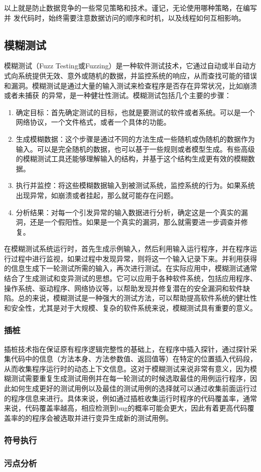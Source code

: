 以上就是防止数据竞争的一些常见策略和技术。谨记，无论使用哪种策略，在编写并 发代码时，始终需要注意数据访问的顺序和时机，以及线程如何互相影响。

\subsection{模糊测试}

模糊测试（Fuzz Testing或Fuzzing）是一种软件测试技术，它通过自动或半自动方式向系统提供无效、意外或随机的数据，并监控系统的响应，从而查找可能的错误和漏洞。模糊测试是通过大量的输入测试来检查程序是否存在异常状况，比如崩溃或者未捕获 的异常，是一种健壮性测试。模糊测试包括几个主要的步骤：

\begin{enumerate}
\item 确定目标：首先确定测试的目标，也就是要测试的软件或者系统。可以是一个网络协议，一个文件格式，或者一个具体的功能。
\item 生成模糊数据：这个步骤是通过不同的方法生成一些随机或伪随机的数据作为输入。可以是完全随机的数据，也可以基于一些规则或者模型生成。有些高级的模糊测试工具还能够理解输入的结构，并基于这个结构生成更有效的模糊数据。
\item 执行并监控：将这些模糊数据输入到被测试系统，监控系统的行为。如果系统出现异常，如崩溃或者挂起，那么就可能存在问题。
\item 分析结果：对每一个引发异常的输入数据进行分析，确定这是一个真实的漏洞，还是一个假阳性。如果是一个真实的漏洞，那么就需要进一步调查并修复。
\end{enumerate}

在模糊测试系统运行时，首先生成示例输入，然后利用输入运行程序，并在程序运行过程中进行监视，如果过程中发现异常，则将这一个输入记录下来。并利用获得的信息生成下一轮测试所需的输入，再次进行测试。在实际应用中，模糊测试通常结合了生成测试和变异测试的思想。它可以应用于各种软件系统，包括应用程序、操作系统、驱动程序、网络协议等，以帮助发现并修复潜在的安全漏洞和软件缺陷。总的来说，模糊测试是一种强大的测试方法，可以帮助提高软件系统的健壮性和安全性，尤其是对于大规模、复杂的软件系统来说，模糊测试具有重要的意义。

\subsubsection{插桩}

插桩技术指在保证原有程序逻辑完整性的基础上，在程序中插入探针，通过探针采集代码中的信息（方法本身、方法参数值、返回值等）在特定的位置插入代码段，从而收集程序运行时的动态上下文信息。这对于模糊测试来说非常有意义，因为模糊测试需要重复生成测试用例并在每一轮测试的时候选取最佳的用例运行程序，因此如何生成更好的测试用例以及最佳的测试用例的选择就可以通过收集前面运行过的程序信息来进行。具体来说，例如通过插桩收集运行时程序的代码覆盖率，通常来说，代码覆盖率越高，相应检测到bug的概率可能会更大，因此有着更高代码覆盖率的的程序会被选取并进行变异生成新的测试用例。

\subsubsection{符号执行}

\subsubsection{污点分析}